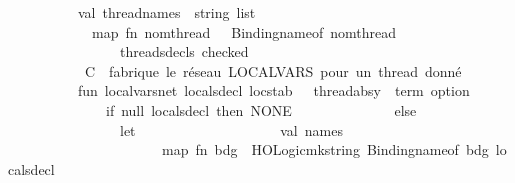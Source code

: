\begin{isabellebody}
\ \ \ \ \ \ \ \ \ \ val\ thread{\isacharunderscore}{\kern0pt}names\ {\isacharcolon}{\kern0pt}\ string\ list\ {\isacharequal}{\kern0pt}\isanewline
\ \ \ \ \ \ \ \ \ \ \ \ map\ {\isacharparenleft}{\kern0pt}fn\ {\isacharbraceleft}{\kern0pt}nom{\isacharunderscore}{\kern0pt}thread{\isacharcomma}{\kern0pt}\ {\isachardot}{\kern0pt}{\isachardot}{\kern0pt}{\isachardot}{\kern0pt}{\isacharbraceright}{\kern0pt}\ {\isacharequal}{\kern0pt}{\isachargreater}{\kern0pt}\ Binding{\isachardot}{\kern0pt}name{\isacharunderscore}{\kern0pt}of\ nom{\isacharunderscore}{\kern0pt}thread{\isacharparenright}{\kern0pt}\isanewline
\ \ \ \ \ \ \ \ \ \ \ \ \ \ \ \ {\isacharparenleft}{\kern0pt}{\isacharhash}{\kern0pt}threads{\isacharunderscore}{\kern0pt}decls\ checked{\isacharparenright}{\kern0pt}\isanewline
\ \ \ \ \ \ \ \ \ \ \isanewline
\isanewline
\ \ \ \ \ \ \ \ \ \ \isanewline
\ \ \ \ \ \ \ \ \ \ {\isacharparenleft}{\kern0pt}{\isacharasterisk}{\kern0pt}\ C{\isachardot}{\kern0pt}\ \ fabrique\ le\ réseau\ LOCALVARS\ pour\ un\ thread\ donné\ {\isacharminus}{\kern0pt}{\isacharminus}{\kern0pt}{\isacharminus}{\kern0pt}{\isacharminus}{\kern0pt}{\isacharminus}{\kern0pt}{\isacharminus}{\kern0pt}{\isacharminus}{\kern0pt}{\isacharminus}{\kern0pt}{\isacharminus}{\kern0pt}{\isacharminus}{\kern0pt}{\isacharminus}{\kern0pt}{\isacharminus}{\kern0pt}{\isacharminus}{\kern0pt}{\isacharminus}{\kern0pt}{\isacharminus}{\kern0pt}\ {\isacharasterisk}{\kern0pt}{\isacharparenright}{\kern0pt}\isanewline
\ \ \ \ \ \ \ \ \ \ fun\ localvars{\isacharunderscore}{\kern0pt}net\ {\isacharparenleft}{\kern0pt}{\isacharbraceleft}{\kern0pt}locals{\isacharunderscore}{\kern0pt}decl{\isacharcomma}{\kern0pt}\ locstab{\isacharcomma}{\kern0pt}\ {\isachardot}{\kern0pt}{\isachardot}{\kern0pt}{\isachardot}{\kern0pt}{\isacharbraceright}{\kern0pt}\ {\isacharcolon}{\kern0pt}\ thread{\isacharunderscore}{\kern0pt}absy{\isacharparenright}{\kern0pt}\ {\isacharcolon}{\kern0pt}\ term\ option\ {\isacharequal}{\kern0pt}\isanewline
\ \ \ \ \ \ \ \ \ \ \ \ \ \ if\ null\ locals{\isacharunderscore}{\kern0pt}decl\ then\ NONE\isanewline
\ \ \ \ \ \ \ \ \ \ \ \ \ \ else\ \ \ \ \isanewline
\ \ \ \ \ \ \ \ \ \ \ \ \ \ \ \ let\isanewline
\ \ \ \ \ \ \ \ \ \ \ \ \ \ \ \ \ \ \ \ val\ names\ {\isacharequal}{\kern0pt}\isanewline
\ \ \ \ \ \ \ \ \ \ \ \ \ \ \ \ \ \ \ \ \ \ map\ {\isacharparenleft}{\kern0pt}fn\ {\isacharparenleft}{\kern0pt}{\isacharparenleft}{\kern0pt}bdg{\isacharcomma}{\kern0pt}{\isacharunderscore}{\kern0pt}{\isacharparenright}{\kern0pt}{\isacharcomma}{\kern0pt}{\isacharunderscore}{\kern0pt}{\isacharparenright}{\kern0pt}\ {\isacharequal}{\kern0pt}{\isachargreater}{\kern0pt}\ HOLogic{\isachardot}{\kern0pt}mk{\isacharunderscore}{\kern0pt}string\ {\isacharparenleft}{\kern0pt}Binding{\isachardot}{\kern0pt}name{\isacharunderscore}{\kern0pt}of\ bdg{\isacharparenright}{\kern0pt}{\isacharparenright}{\kern0pt}\ locals{\isacharunderscore}{\kern0pt}decl\isanewline

\end{isabellebody}
